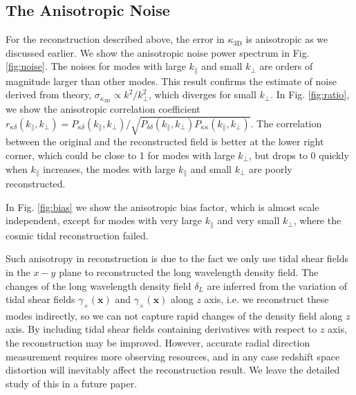 \documentclass[aps,prd,twocolumn,showpacs,superscriptaddress,groupedaddress,nofootinbib]{revtex4}  %
\newcommand{\mr}{\mathrm}
\begin{document}
\subsection{The Anisotropic Noise}
For the reconstruction described above, the error in $\kappa_\mr{3D}$ is anisotropic as we 
discussed earlier. We show the anisotropic noise power spectrum in Fig. \ref{fig:noise}. 
The noises for modes with large $k_\parallel$ and small $k_\perp$ are orders of
magnitude larger than other modes. This result confirms the estimate of noise derived from 
theory, $\sigma_{\kappa_\mr{3D}}\propto k^2/k_\perp^2$, which diverges for
small $k_\perp$. In Fig. \ref{fig:ratio}, we show the anisotropic correlation coefficient
$r_{\kappa\delta}(k_\parallel,k_\perp)=P_{\kappa\delta}(k_\parallel,k_\perp)/\sqrt{
P_{\delta\delta}(k_\parallel,k_\perp)P_{\kappa\kappa}(k_\parallel,k_\perp)}$.
The correlation between the original and the reconstructed field is better 
at the lower right corner, which could be close to 1 for modes with large $k_\perp$, but drops
to 0 quickly when $k_\parallel$ increases, the modes with large $k_\parallel$ 
and small $k_\perp$ are poorly reconstructed.

In Fig. \ref{fig:bias} we show the anisotropic bias factor, which
is almost scale independent, except for modes with very large $k_\parallel$ and 
very small $k_\perp$, where the cosmic tidal reconstruction failed. 


Such anisotropy in reconstruction is due to the fact we only use tidal shear fields in
the $x-y$ plane to reconstructed the long wavelength  density field.
The changes of the long wavelength density field $\delta_L$ are inferred from the 
variation of tidal shear fields $\gamma_+(\bm{x})$ and $\gamma_\times(\bm{x})$ 
along $z$ axis, i.e. we reconstruct these modes indirectly, so we can not
capture rapid changes of the density field along $z$ axis. 
By including tidal shear fields containing
derivatives with respect to $z$ axis, the reconstruction may be improved. 
However, accurate radial direction measurement requires more observing resources,
and in any case redshift space distortion will inevitably affect the reconstruction result. 
We leave the detailed study of this  in  a future paper.
\end{document}
